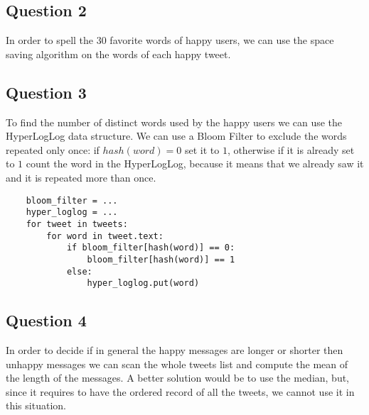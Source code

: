 \documentclass{article}
\begin{document}
\subsection{Question 2}
In order to spell the 30 favorite words of happy users, we can use the space saving algorithm on the words of each happy tweet.

\subsection{Question 3}
To find the number of distinct words used by the happy users we can use the HyperLogLog data structure. We can use a Bloom Filter to exclude the words repeated only once: if $hash(word)=0$ set it to $1$, otherwise if it is already set to $1$ count the word in the HyperLogLog, because it means that we already saw it and it is repeated more than once.
\begin{verbatim}
    bloom_filter = ...
    hyper_loglog = ...
    for tweet in tweets:
        for word in tweet.text:
            if bloom_filter[hash(word)] == 0:
                bloom_filter[hash(word)] == 1
            else:
                hyper_loglog.put(word)
\end{verbatim}

\subsection{Question 4}
In order to decide if in general the happy messages are longer or shorter then unhappy messages we can scan the whole tweets list and compute the mean of the length of the messages. A better solution would be to use the median, but, since it requires to have the ordered record of all the tweets, we cannot use it in this situation.
\end{document}
